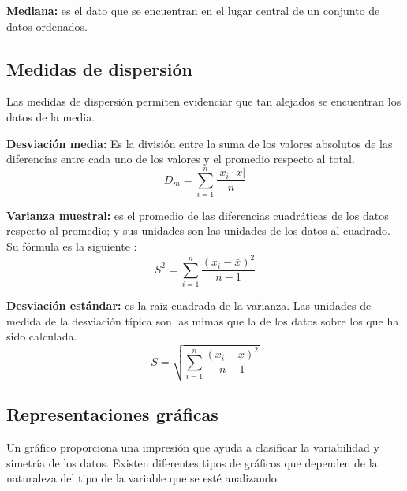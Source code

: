 \documentclass[a5paper,doc,10pt,noapacite]{apa6}
\begin{document}
{{\vspace{1\baselineskip}
\textbf{Mediana:} es el dato que se encuentran en el lugar central de un conjunto de datos ordenados. 



\newpage



\subsection{Medidas de dispersión}
Las medidas de dispersión permiten evidenciar que tan alejados se encuentran los datos de la media.

\vspace{1\baselineskip}
\textbf{Desviación media:} Es la división entre la suma de los valores absolutos de las diferencias entre cada uno de los valores y el promedio respecto al total.
\[
	D_{m}= \sum_{i=1}^{n} \dfrac{|x_{i} \cdot \bar{x}|}{n}
\] 

\textbf{Varianza muestral:} es el promedio de las diferencias cuadráticas de los datos respecto al promedio; y sus unidades son las unidades de los datos al cuadrado. Su fórmula es la siguiente \cite{Vargas-1995}:
\[
	S^{2}= \sum_{i=1}^{n} \dfrac{ \left( x_{i}-\bar{x} \right)^{2}}{n-1}
\]

\textbf{Desviación estándar:} es la raíz cuadrada de la varianza. Las unidades de medida de la desviación típica son las mimas que la de los datos sobre los que ha sido calculada.
\[
	S= \sqrt{ \sum_{i=1}^{n} \dfrac{ \left( x_{i}-\bar{x} \right)^{2}}{n-1} }
\]


\subsection{Representaciones gráficas}

Un gráfico proporciona una impresión que ayuda a clasificar la variabilidad y simetría de los datos. Existen diferentes tipos de gráficos que dependen de la naturaleza del tipo de la variable que se esté analizando.

}}
\end{document}
